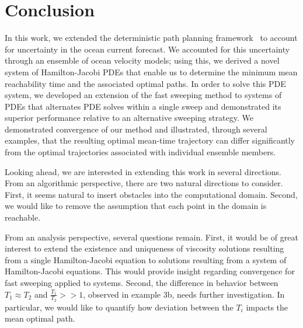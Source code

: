 \documentclass[pdflatex,sn-mathphys-num]{sn-jnl}%
\theoremstyle{thmstyleone}%
\theoremstyle{thmstyletwo}%
\theoremstyle{thmstylethree}%
\begin{document}
\section{Conclusion}
\label{sec:5}
In this work, we extended the deterministic path planning framework~\cite{Brandman2023} to account for uncertainty in the ocean current forecast.  We accounted for this uncertainty through an ensemble of ocean velocity models; using this, we derived a novel system of Hamilton-Jacobi PDEs that enable us to determine the minimum mean reachability time and the associated optimal paths.  In order to solve this PDE system, we developed an extension of the fast sweeping method to systems of PDEs that alternates PDE solves within a single sweep and demonstrated its superior performance relative to an alternative sweeping strategy.  We %
demonstrated convergence of our method and illustrated, through several examples, that the resulting optimal mean-time trajectory can differ significantly from the optimal trajectories associated with individual ensemble members.  

Looking ahead, we are interested in extending this work in several directions.  %
From an algorithmic perspective, there are two natural directions to consider.  First, it seems natural to insert obstacles into the computational domain.  Second, we would like to remove the assumption that each point in the domain is reachable.  

From an analysis perspective, several questions remain.  First, it would be of great interest to extend the existence and uniqueness of viscosity solutions resulting from a single Hamilton-Jacobi equation to solutions resulting from a system of Hamilton-Jacobi equations.  This would provide insight regarding convergence for fast sweeping applied to systems.  Second, the difference in behavior between $T_1 \approx T_2$ and $\frac{T_1}{T_2}>>1$, observed in example 3b, needs further investigation.  In particular, we would like to quantify how deviation between the $T_i$ impacts the mean optimal path.
\end{document}
